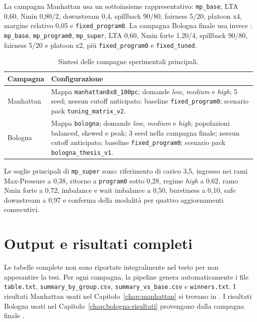 \documentclass[12pt,a4paper,oneside]{report}
\numberwithin{equation}{chapter}
\begin{document}
La campagna Manhattan usa un sottoinsieme rappresentativo: \texttt{mp\_base}, LTA 0,60,
Nmin 0,80/2, downstream 0,4, spillback 90/80, fairness 5/20, platoon x4,
margine relativo 0,05 e \texttt{fixed\_program0}. La campagna Bologna finale
usa invece : \texttt{mp\_base}, \texttt{mp\_program0},
\texttt{mp\_super}, LTA 0,60, Nmin forte 1,20/4, spillback 90/80, fairness
5/20 e platoon x2, più \texttt{fixed\_program0} e
\texttt{fixed\_tuned}.

\begin{table}[htbp]
    \centering
    \small
    \caption{Sintesi delle campagne sperimentali principali.}
    \label{tab:appendice-campagne}
    \begin{tabularx}{\textwidth}{lX}
        \toprule
        Campagna & Configurazione \\
        \midrule
        Manhattan &
        Mappa \texttt{manhattan8x8\_100pc}; domande \emph{low}, \emph{medium} e \emph{high};
        5 seed; nessun cutoff anticipato; baseline
        \texttt{fixed\_program0}; scenario pack \texttt{tuning\_matrix\_v2}. \\
        Bologna &
        Mappa \texttt{bologna}; domande \emph{low}, \emph{medium} e \emph{high}; popolazioni
        balanced, skewed e peak; 3 seed nella campagna finale; nessun cutoff
        anticipato; baseline \texttt{fixed\_program0}; scenario pack
        \texttt{bologna\_thesis\_v1}. \\
        \bottomrule
    \end{tabularx}
\end{table}

Le soglie principali di \texttt{mp\_super} sono: riferimento di carico 3,5,
ingresso nei rami Max-Pressure a 0,38, ritorno a \texttt{program0} sotto 0,28,
regime \emph{high} a 0,62, ramo Nmin forte a 0,72, imbalance e wait imbalance a 0,50,
burstiness a 0,10, safe downstream a 0,97 e conferma della modalità per
quattro aggiornamenti consecutivi.

\section{Output e risultati completi}
\label{app:risultati}

Le tabelle complete non sono riportate integralmente nel testo per non
appesantire la tesi. Per ogni campagna, la pipeline genera automaticamente i
file \texttt{table.txt}, \texttt{summary\_by\_group.csv},
\texttt{summary\_vs\_base.csv} e \texttt{winners.txt}. I risultati Manhattan
usati nel Capitolo~\ref{chap:manhattan} si trovano in
. I risultati Bologna usati
nel Capitolo~\ref{chap:bologna-risultati} provengono dalla campagna finale
.
\end{document}
